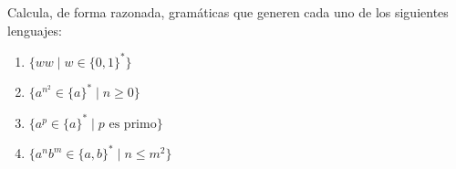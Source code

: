 \begin{ejercicio}
    Calcula, de forma razonada, gramáticas que generen cada uno de los siguientes lenguajes:
    \begin{enumerate}
        \item $\{ww \mid w \in \{0,1\}^\ast\}$




        \item $\{a^{n^2} \in \{a\}^{\ast} \mid n\geq 0\}$
        \item $\{a^p \in \{a\}^{\ast} \mid p \text{ es primo}\}$
        \item $\{a^nb^m \in \{a,b\}^{\ast} \mid n\leq m^2\}$
    \end{enumerate}

\end{ejercicio}

